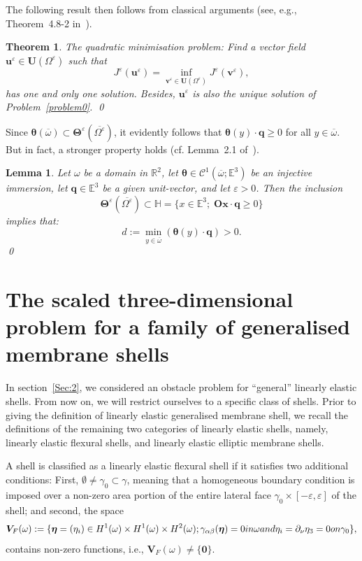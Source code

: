 \documentclass{amsart}
\newtheorem{theorem}{Theorem}[section]
\newtheorem{lemma}{Lemma}[section]
\begin{document}
The following result then follows from classical arguments (see, e.g., Theorem~4.8-2 in~\cite{Ciarlet2025}).
\begin{theorem} 
\label{t:2}
 The quadratic minimisation problem: Find a vector field $\bm{u}^\varepsilon \in \bm{U}(\Omega^\varepsilon)$ such that
$$
J^\varepsilon(\bm{u}^\varepsilon) = \inf_{\bm{v}^\varepsilon \in \bm{U} (\Omega^\varepsilon)} J^\varepsilon (\bm{v}^\varepsilon),
$$
has one and only one solution. Besides, $\bm{u}^\varepsilon$ is also the unique solution of Problem~\ref{problem0}.
\qed
\end{theorem}

Since $\bm{\theta}(\overline{\omega})\subset\bm{\Theta}^\varepsilon(\overline{\Omega^\varepsilon})$, it evidently follows that $\bm{\theta}(y)\cdot\bm{q}\ge 0$ for all $y\in \overline{\omega}$. But in fact, a stronger property holds (cf. Lemma~2.1 of~\cite{CiaMarPie2018}).

\begin{lemma}
\label{lem:1}
Let $\omega$ be a domain in $\mathbb{R}^2$, let $\bm{\theta} \in \mathcal{C}^1(\overline{\omega};\mathbb{E}^3)$ be an injective immersion, let $\bm{q} \in \mathbb{E}^3$ be a given unit-vector, and let $\varepsilon > 0$. Then the inclusion
$$
\bm{\Theta}^\varepsilon(\overline{\Omega^\varepsilon})\subset \mathbb{H} = \{x\in\mathbb{E}^3;\;\boldsymbol{Ox} \cdot \bm{q} \ge 0\}
$$
implies that:
$$
d:=\min_{y \in \overline{\omega}}(\bm{\theta}(y)\cdot\bm{q})>0.
$$
\qed
\end{lemma}

\section{The scaled three-dimensional problem for a family of generalised membrane shells} 
\label{Sec:3}

In section~\ref{Sec:2}, we considered an obstacle problem for ``general'' linearly elastic shells. From now on, we will restrict ourselves  to a specific class of shells. Prior to giving the definition of linearly elastic generalised membrane shell, we recall the definitions of the remaining two categories of linearly elastic shells, namely, linearly elastic flexural shells, and linearly elastic elliptic membrane shells.

A shell is classified as a linearly elastic flexural shell if it satisfies two additional conditions: First, $\emptyset \neq \gamma_0 \subset \gamma$, meaning that a homogeneous boundary condition is imposed over a non-zero area portion of the entire lateral face $\gamma_0 \times \left[-\varepsilon,\varepsilon\right]$ of the shell; and second, the space
\begin{equation*}
	\bm{V}_F(\omega):=\{\bm{\eta}=(\eta_i) \in H^1(\omega)\times H^1(\omega)\times H^2(\omega); \gamma_{\alpha\beta}(\bm{\eta})=0 \textup{ in }\omega
	\textup{ and }\eta_i=\partial_{\nu}\eta_3=0 \textup{ on }\gamma_0\},
\end{equation*}
contains non-zero functions, i.e., $\bm{V}_F(\omega)\neq\{\bm{0}\}$.
\end{document}
